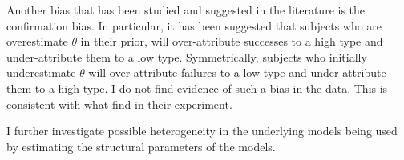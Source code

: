 \documentclass[
  12pt,
]{article}
\begin{document}
Another bias that has been studied and suggested in the literature is
the confirmation bias. In particular, it has been suggested that
subjects who are overestimate \(\theta\) in their prior, will
over-attribute successes to a high type and under-attribute them to a
low type. Symmetrically, subjects who initially underestimate \(\theta\)
will over-attribute failures to a low type and under-attribute them to a
high type. I do not find evidence of such a bias in the data. This is
consistent with what \citet{Mobius2022} find in their experiment.

I further investigate possible heterogeneity in the underlying models
being used by estimating the structural parameters of the models.

\renewcommand\refname{References}
  
\end{document}
